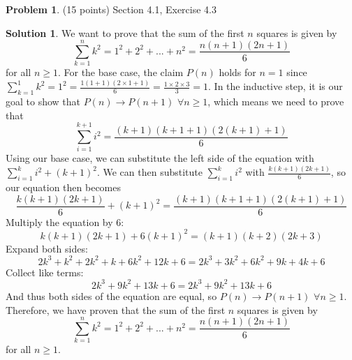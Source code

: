 \documentclass{article}
\theoremstyle{definition}
\newtheorem{problem}{Problem}
\newtheorem*{solution}{Solution}
\begin{document}
\newpage
\begin{problem} (15 points) Section 4.1, Exercise 4.3 
\end{problem}
\begin{solution}
We want to prove that the sum of the first $n$ squares is given by \[\sum_{k=1}^{n} k^2 = 1^2 + 2^2 + ... + n^2 = \frac{n(n+1)(2n+1)}{6}\] for all $n \ge 1$.
For the base case, the claim $P(n)$ holds for $n = 1$ since $\sum_{k=1}^{1} k^2 = 1^2 = \frac{1(1 + 1)(2 \times 1 + 1)}{6} = \frac{1\times2\times3}{3} =1$.
In the inductive step, it is our goal to show that $P(n) \rightarrow P(n+1)$ $\forall n \ge 1$, which means we need to prove that \[\sum_{i=1}^{k+1} i^{2} = \frac{(k+1)(k+1+1)(2(k+1)+1)}{6}\]
Using our base case, we can substitute the left side of the equation with $\sum_{i=1}^{k} i^{2} + (k+1)^{2}$.
We can then substitute $\sum_{i=1}^{k} i^{2}$ with $\frac{k(k+1)(2k+1)}{6}$, so our equation then becomes \[\frac{k(k+1)(2k+1)}{6} + (k+1)^{2} = \frac{(k+1)(k+1+1)(2(k+1)+1)}{6}\]
Multiply the equation by 6: \[k(k+1)(2k+1) + 6(k+1)^{2} = (k+1)(k+2)(2k+3)\]
Expand both sides:\[2k^{3}+k^{2}+2k^{2}+k+6k^{2}+12k+6 = 2k^{3}+3k^{2}+6k^{2}+9k+4k+6\]
Collect like terms: \[2k^{3}+9k^{2}+13k+6 = 2k^{3}+9k^{2}+13k+6\]
And thus both sides of the equation are equal, so $P(n) \rightarrow P(n+1)$ $\forall n \ge 1$.
Therefore, we have proven that the sum of the first $n$ squares is given by \[\sum_{k=1}^{n} k^2 = 1^2 + 2^2 + ... + n^2 = \frac{n(n+1)(2n+1)}{6}\] for all $n \ge 1$.
\end{solution}
\end{document}
